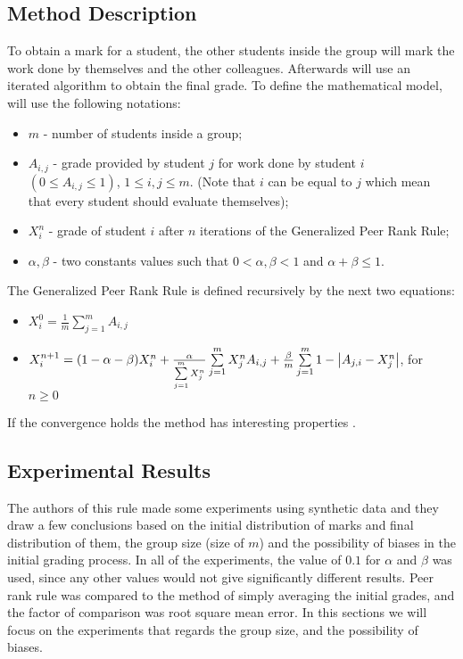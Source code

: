 \subsection{Method Description}
To obtain a mark for a student, the other students inside the group will mark the work done by themselves and the other colleagues. Afterwards will use an iterated algorithm to obtain the final grade. To define the mathematical model, will use the following notations:
\begin{itemize}
	\item $m$ - number of students inside a group;
	\item $A_{i,j}$ - grade provided by student $j$ for work done by student $i$ $(0 \leq A_{i,j} \leq 1)$, $1 \leq i, j \leq m$. (Note that $i$ can be equal to $j$ which mean that every student should evaluate themselves);
	\item $X_i^n$ - grade of student $i$ after $n$ iterations of the Generalized Peer Rank Rule;
	\item $\alpha, \beta$ - two constants values such that $0 < \alpha, \beta < 1$ and $\alpha + \beta \leq 1$.
\end{itemize}
The Generalized Peer Rank Rule is defined recursively by the next two equations:
\begin{itemize}
	\item $X_i^0 = \frac{1}{m} \sum\limits_{j=1}^{m} A_{i,j}$
	\item $X_i^{n+1} = (1 - \alpha - \beta) X_i^n + \frac{\alpha}{\sum\limits_{j=1}^{m}X_j^n} \sum\limits_{j=1}^{m} X_j^n A_{i,j} + \frac{\beta}{m}\sum\limits_{j=1}^{m}1 - \big{|} A_{j,i} - X_j^n \big{|}$, for $n \ge 0$
\end{itemize}
If the convergence holds the method has interesting properties \cite{walsh}.

\subsection{Experimental Results}
The authors of this rule made some experiments using synthetic data and they draw a few conclusions based on the initial distribution of marks and final distribution of them, the group size (size of $m$) and the possibility of biases in the initial grading process. In all of the experiments, the value of $0.1$ for $\alpha$ and $\beta$ was used, since any other values would not give significantly different results. Peer rank rule was compared to the method of simply averaging the initial grades, and the factor of comparison was root square mean error. In this sections we will focus on the experiments that regards the group size, and the possibility of biases.

